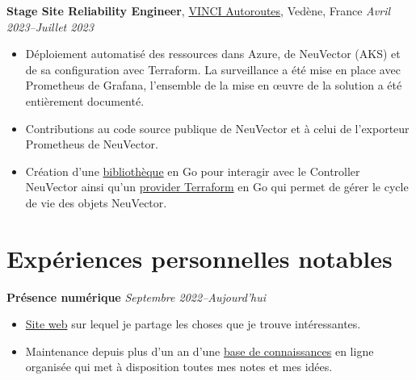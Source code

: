 \documentclass[margin,line]{../res}
\begin{document}
\begin{resume}
  {\bf Stage Site Reliability Engineer},
  \href{https://www.vinci-autoroutes.com}{VINCI Autoroutes}, Vedène, France
  \hfill {\it Avril 2023--Juillet 2023}
  \vspace*{.05in}
  \begin{itemize}
    \item Déploiement automatisé des ressources dans Azure, de
      NeuVector (AKS) et de sa configuration avec Terraform. La
      surveillance a été mise en place avec Prometheus de Grafana,
      l'ensemble de la mise en œuvre de la solution
      a été entièrement documenté.
    \item Contributions au code source publique de NeuVector et à celui de
      l'exporteur Prometheus de NeuVector.
    \item Création d'une
      \href{https://github.com/theobori/go-neuvector}{bibliothèque}
      en Go pour interagir avec le Controller NeuVector ainsi qu'un
      \href{https://registry.terraform.io/providers/theobori/neuvector/latest}{provider
      Terraform} en Go qui permet de gérer le cycle de vie des objets NeuVector.
  \end{itemize}

  \section{\sc Expériences personnelles notables}

  {\bf Présence numérique}
  \hfill {\it Septembre 2022--Aujourd'hui}
  \vspace*{.05in}
  \begin{itemize}
    \item \href{https://theobori.cafe}{Site web} sur lequel je
      partage les choses que je trouve intéressantes.
    \item Maintenance depuis plus d'un an d'une
      \href{https://zettel.theobori.cafe}{base de connaissances} en
      ligne organisée qui met à disposition toutes mes notes et mes idées.
  \end{itemize}


\end{resume}
\end{document}
